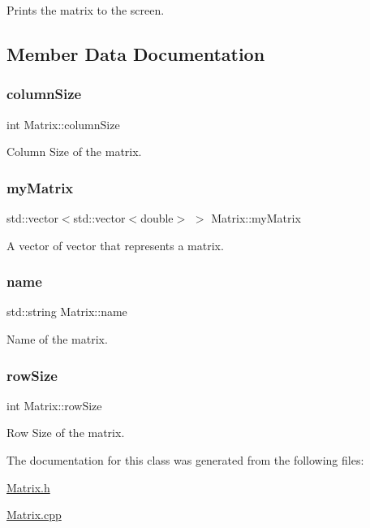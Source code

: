 Prints the matrix to the screen. 



\subsection{Member Data Documentation}
\mbox{\label{class_matrix_aab666250ce075e35e1d7d0d8097cc884}} 
\subsubsection{\texorpdfstring{column\+Size}{columnSize}}
{\footnotesize\ttfamily int Matrix\+::column\+Size}



Column Size of the matrix. 

\mbox{\label{class_matrix_afdea8580ef7ee0072e0100c72c18e218}} 
\subsubsection{\texorpdfstring{my\+Matrix}{myMatrix}}
{\footnotesize\ttfamily std\+::vector$<$std\+::vector$<$double$>$ $>$ Matrix\+::my\+Matrix}



A vector of vector that represents a matrix. 

\mbox{\label{class_matrix_ab15f3c0e2ef820cc3aa6d58475b15443}} 
\subsubsection{\texorpdfstring{name}{name}}
{\footnotesize\ttfamily std\+::string Matrix\+::name}



Name of the matrix. 

\mbox{\label{class_matrix_aa5b31a8cec6508cf23b72394ff8aabe7}} 
\subsubsection{\texorpdfstring{row\+Size}{rowSize}}
{\footnotesize\ttfamily int Matrix\+::row\+Size}



Row Size of the matrix. 



The documentation for this class was generated from the following files\+:\begin{DoxyCompactItemize}
\item 
\hyperlink{_matrix_8h}{Matrix.\+h}\item 
\hyperlink{_matrix_8cpp}{Matrix.\+cpp}\end{DoxyCompactItemize}

